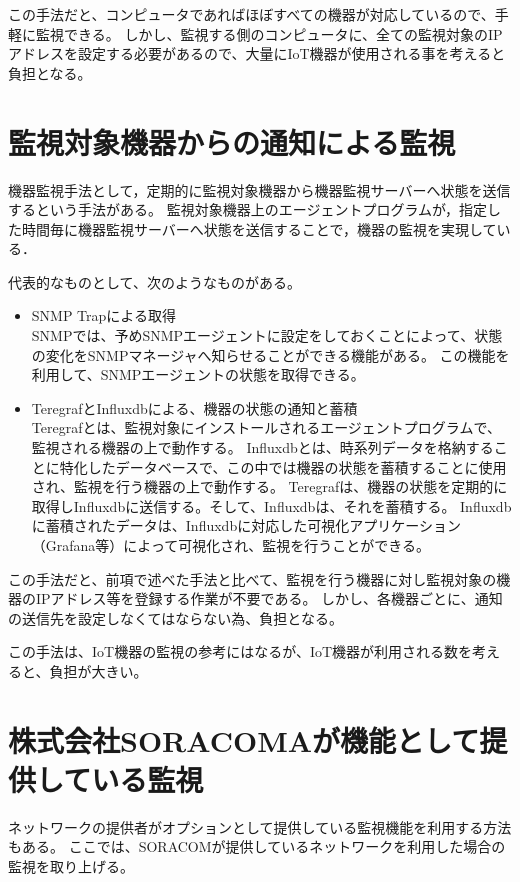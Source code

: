	この手法だと、コンピュータであればほぼすべての機器が対応しているので、手軽に監視できる。
	しかし、監視する側のコンピュータに、全ての監視対象のIPアドレスを設定する必要があるので、大量にIoT機器が使用される事を考えると負担となる。

\section{監視対象機器からの通知による監視}
	機器監視手法として，定期的に監視対象機器から機器監視サーバーへ状態を送信するという手法がある。
	監視対象機器上のエージェントプログラムが，指定した時間毎に機器監視サーバーへ状態を送信することで，機器の監視を実現している．
	\medskip
	
	代表的なものとして、次のようなものがある。
	\begin{itemize}
		\item SNMP Trapによる取得\\
			SNMPでは、予めSNMPエージェントに設定をしておくことによって、状態の変化をSNMPマネージャへ知らせることができる機能がある。
			この機能を利用して、SNMPエージェントの状態を取得できる。
		\item TeregrafとInfluxdbによる、機器の状態の通知と蓄積\\
					Teregrafとは、監視対象にインストールされるエージェントプログラムで、監視される機器の上で動作する。
					Influxdbとは、時系列データを格納することに特化したデータベースで、この中では機器の状態を蓄積することに使用され、監視を行う機器の上で動作する。
					Teregrafは、機器の状態を定期的に取得しInfluxdbに送信する。そして、Influxdbは、それを蓄積する。
					Influxdbに蓄積されたデータは、Influxdbに対応した可視化アプリケーション（Grafana等）によって可視化され、監視を行うことができる。
	\end{itemize}
	
	この手法だと、前項で述べた手法と比べて、監視を行う機器に対し監視対象の機器のIPアドレス等を登録する作業が不要である。
	しかし、各機器ごとに、通知の送信先を設定しなくてはならない為、負担となる。

	この手法は、IoT機器の監視の参考にはなるが、IoT機器が利用される数を考えると、負担が大きい。

\section{株式会社SORACOMAが機能として提供している監視} %
	ネットワークの提供者がオプションとして提供している監視機能を利用する方法もある。
	ここでは、SORACOMが提供しているネットワークを利用した場合の監視を取り上げる。
	
